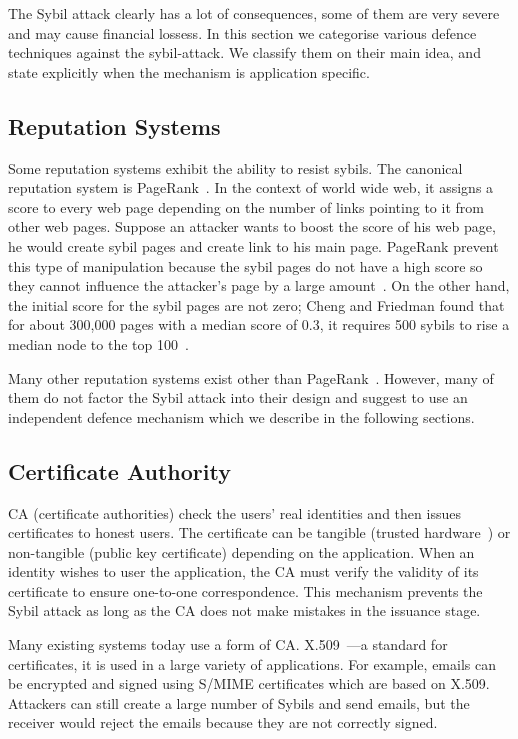 The Sybil attack clearly has a lot of consequences, some of them are very severe
and may cause financial lossess. In this section we categorise various defence
techniques against the sybil-attack. We classify them on their main idea, and
state explicitly when the mechanism is application specific.

\subsection{Reputation Systems}
Some reputation systems exhibit the ability to resist sybils. The canonical
reputation system is PageRank~\cite{page1999pagerank}. In the context of world
wide web, it assigns a score to every web page depending on the number of links
pointing to it from other web pages. Suppose an attacker wants to boost the
score of his web page, he would create sybil pages and create link to his main
page. PageRank prevent this type of manipulation because the sybil pages do not
have a high score so they cannot influence the attacker's page by a large
amount~\cite{baeza2005pagerank}. On the other hand, the initial score for the
sybil pages are not zero; Cheng and Friedman found that for about 300,000 pages
with a median score of 0.3, it requires 500 sybils to rise a median node to the
top 100~\cite{cheng2006manipulability}.

Many other reputation systems exist other than
PageRank~\cite{kamvar2003eigentrust, srivatsa2005trustguard,
  nandi2005scrivener}. However, many of them do not factor the Sybil attack into
their design and suggest to use an independent defence mechanism which we
describe in the following sections.

\subsection{Certificate Authority}\label{sec:cert-authority}
CA (certificate authorities) check the users' real identities and then issues
certificates to honest users. The certificate can be tangible (trusted
hardware~\cite{newsome2004sybil}) or non-tangible (public key certificate)
depending on the application. When an identity wishes to user the application,
the CA must verify the validity of its certificate to ensure one-to-one
correspondence. This mechanism prevents the Sybil attack as long as the CA does
not make mistakes in the issuance stage.

Many existing systems today use a form of CA.
X.509~\cite{housley2002internet}---a standard for certificates, it is used in a
large variety of applications. For example, emails can be encrypted and signed
using S/MIME\cite{ramsdell2010secure} certificates which are based on X.509.
Attackers can still create a large number of Sybils and send emails, but the
receiver would reject the emails because they are not correctly signed.

